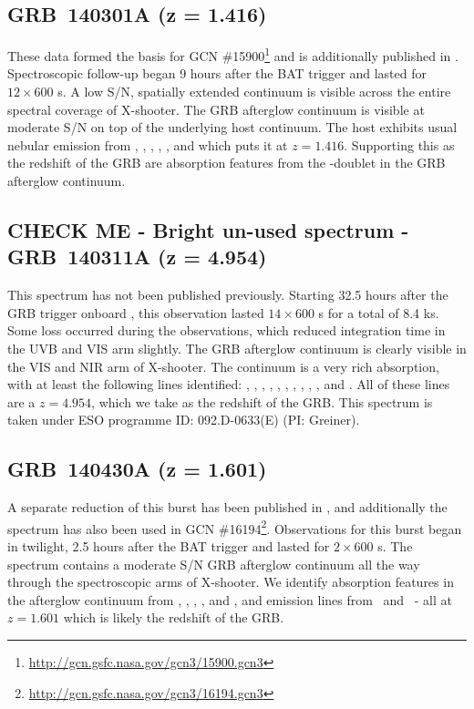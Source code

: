 \documentclass{aa}    %
\begin{document}
\subsection{GRB~140301A (z = 1.416)}	

These data formed the basis for GCN
\#15900\footnote{\url{http://gcn.gsfc.nasa.gov/gcn3/15900.gcn3}} and is
additionally published in \citet{Kruhler2015}. Spectroscopic follow-up began 9
hours after the BAT trigger and lasted for $12\times600$ s. A low S/N, spatially
extended continuum is visible across the entire spectral coverage of X-shooter.
The GRB afterglow continuum is visible at moderate S/N on top of the underlying
host continuum. The host exhibits usual nebular emission from \oii, \hb, \oiii,
\ha, \nii, and \sii which puts it at $z = 1.416$. Supporting this as the
redshift of the GRB are absorption features from the \mgii-doublet in the GRB
afterglow continuum.

\subsection{CHECK ME - Bright un-used spectrum - GRB~140311A (z = 4.954)}	

This spectrum has not been published previously. Starting 32.5 hours after the
GRB trigger onboard \swift, this observation lasted $14\times600$ s for a total
of 8.4 ks. Some loss occurred during the observations, which reduced integration
time in the UVB and VIS arm slightly. The GRB afterglow continuum is clearly
visible in the VIS and NIR arm of X-shooter. The continuum is a very rich
absorption, with at least the following lines identified: \lyg, \lyb, \lya,
\SIii, \SIiv, \civ, \alii, \aliii, \feii, \mgii, and \mgi. All of these lines
are a $z = 4.954$, which we take as the redshift of the GRB. This spectrum is
taken under ESO programme ID: 092.D-0633(E) (PI: Greiner).

\subsection{GRB~140430A (z = 1.601)}	

A separate reduction of this burst has been published in \citet{Kruhler2015},
and additionally the spectrum has also been used in GCN
\#16194\footnote{\url{http://gcn.gsfc.nasa.gov/gcn3/16194.gcn3}}. Observations
for this burst began in twilight, 2.5 hours after the BAT trigger and lasted for
$2\times600$ s. The spectrum contains a moderate S/N GRB afterglow continuum all
the way through the spectroscopic arms of X-shooter. We identify absorption
features in the afterglow continuum from \SIii, \civ, \alii, \feii, and \mgii,
and emission lines from \oii~and \oiii~- all at $z = 1.601$ which is likely the
redshift of the GRB.
\end{document}
